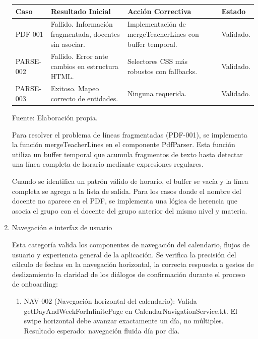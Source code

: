 \begin{enumerate}
  \begin{center}
  \begin{minipage}{\linewidth}
  \centering
  \begin{tabularx}{\linewidth}{@{}>{\RaggedRight\arraybackslash}p{2.0cm}>{\RaggedRight\arraybackslash}X>{\RaggedRight\arraybackslash}X>{\RaggedRight\arraybackslash}p{1.8cm}@{}}
  \toprule
  Caso & Resultado Inicial & Acción Correctiva & Estado \\
  \midrule
  PDF-001 & Fallido. Información fragmentada, docentes sin asociar. & Implementación de mergeTeacherLines con buffer temporal. & Validado. \\
  \addlinespace
  PARSE-002 & Fallido. Error ante cambios en estructura HTML. & Selectores CSS más robustos con fallbacks. & Validado. \\
  \addlinespace
  PARSE-003 & Exitoso. Mapeo correcto de entidades. & Ninguna requerida. & Validado. \\
  \bottomrule
  \end{tabularx}
  \label{tab:qa_parseo}
  Fuente: Elaboración propia.
  \end{minipage}
  \end{center}
  
  Para resolver el problema de líneas fragmentadas (PDF-001), se implementa la función mergeTeacherLines en el componente PdfParser. Esta función utiliza un buffer temporal que acumula fragmentos de texto hasta detectar una línea completa de horario mediante expresiones regulares.
  
  Cuando se identifica un patrón válido de horario, el buffer se vacía y la línea completa se agrega a la lista de salida. Para los casos donde el nombre del docente no aparece en el PDF, se implementa una lógica de herencia que asocia el grupo con el docente del grupo anterior del mismo nivel y materia.
  
  \item Navegación e interfaz de usuario
  
  Esta categoría valida los componentes de navegación del calendario, flujos de usuario y experiencia general de la aplicación. Se verifica la precisión del cálculo de fechas en la navegación horizontal, la correcta respuesta a gestos de deslizamiento la claridad de los diálogos de confirmación durante el proceso de onboarding:
  
  \begin{enumerate}[label=\alph*)]
    \item NAV-002 (Navegación horizontal del calendario): Valida getDayAndWeekForInfinitePage en CalendarNavigationService.kt. El swipe horizontal debe avanzar exactamente un día, no múltiples. Resultado esperado: navegación fluida día por día.
    

\end{enumerate}
\end{enumerate}
